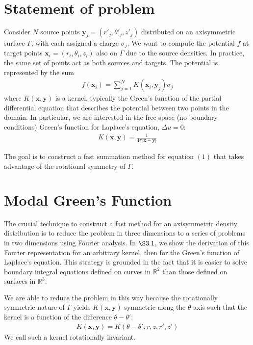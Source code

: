 \documentclass[11pt, oneside]{article}   	%
\begin{document}
\section{Statement of problem}
Consider $N$ source points $\mathbf{y}_j=(r'_j,\theta'_j,z'_j)$ distributed on an axisymmetric surface $\Gamma$, with each assigned a charge $\sigma_j$. We want to compute the potential $f$ at target points $\mathbf{x}_i=(r_i,\theta_i,z_i)$ also on $\Gamma$ due to the source densities.  In practice, the same set of points act as both sources and targets. The potential is represented by the sum
\begin{align}
f(\mathbf{x}_i) = \sum_{j=1}^N K(\mathbf{x}_i,\mathbf{y}_j)\sigma_j
\end{align}
where $K(\mathbf{x},\mathbf{y})$ is a kernel, typically the Green's function of the partial differential equation that describes the potential between two points in the domain. In particular, we are interested in the free-space (no boundary conditions) Green's function for Laplace's equation, $\Delta u = 0$:
\begin{align}
K(\mathbf{x},\mathbf{y}) = \frac{1}{4\pi |\mathbf{x}-\mathbf{y}|}
\end{align}

The goal is to construct a fast summation method for equation $(1)$ that takes advantage of the rotational symmetry of $\Gamma$.

\section{Modal Green's Function}

The crucial technique to construct a fast method for an axisymmetric density distribution is to reduce the problem in three dimensions to a series of problems in two dimensions using Fourier analysis. In $\S3.1$, we show the derivation of this Fourier representation for an arbitrary kernel, then for the Green's function of Laplace's equation. This strategy is grounded in the fact that it is easier to solve boundary integral equations defined on curves in $\mathbb{R}^2$ than those defined on surfaces in $\mathbb{R}^3$.

We are able to reduce the problem in this way because the rotationally symmetric nature of $\Gamma$ yields $K(\mathbf{x},\mathbf{y})$ symmetric along the $\theta$-axis such that the kernel is a function of the difference $\theta-\theta'$:
\begin{align*}
K(\mathbf{x},\mathbf{y})=K(\theta-\theta',r,z,r',z')
\end{align*}
We call such a kernel rotationally invariant.
\end{document}
